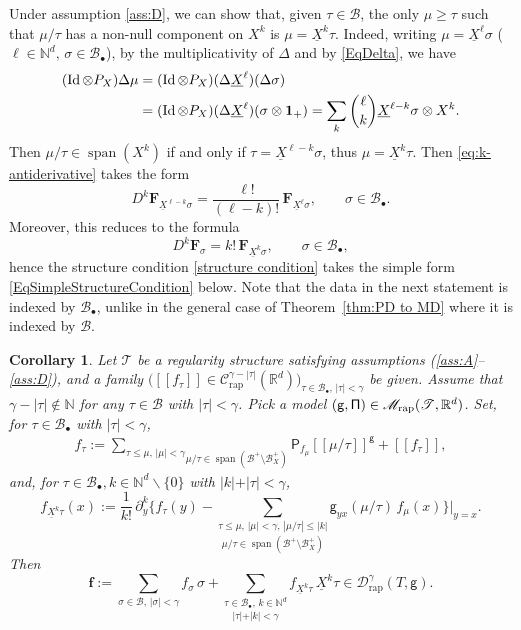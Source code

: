 \documentclass[11pt]{article}
\numberwithin{equation}{section}
\newcommand{\sbullet}{{\scriptscriptstyle\bullet}}
\DeclareMathOperator{\Span}{span}
\theoremstyle{plain}
\newtheorem{cor}[thm]{Corollary}
\theoremstyle{definition}
\DeclareMathOperator{\iden}{Id}
\newcommand{\Brac}[1]{[\![#1]\!]}
\newcommand{\bsf}{\boldsymbol{f}}
\newcommand{\rap}{\mathrm{rap}}
\newcommand{\sfP}{\mathsf{P}}
\newcommand{\sfg}{\mathsf{g}}
\newcommand{\bsF}{\boldsymbol{F}}
\newcommand{\scrM}{\mathscr{M}}
\newcommand{\scrT}{\mathscr{T}}
\newcommand{\bbN}{\mathbb{N}}
\newcommand{\bbR}{\mathbb{R}}
\newcommand{\mcB}{\mathcal{B}}
\newcommand{\mcC}{\mathcal{C}}
\newcommand{\mcD}{\mathcal{D}}
\begin{document}
Under assumption \eqref{ass:D}, we can show that, given $\tau\in\mcB$, the only $\mu\geq \tau$ such that $\mu/\tau$ has a non-null component on $X^k$ is $\mu=\underline{X}^k\tau$. Indeed, writing $\mu=\underline{X}^\ell\sigma$ ($\ell\in\bbN^d,\,\sigma\in\mcB_\sbullet$), by the multiplicativity of $\Delta$ and by \eqref{EqDelta}, we have
\begin{align*}
(\iden \otimes P_X)\Delta\mu
&=(\iden \otimes P_X)(\Delta\underline{X}^\ell)(\Delta\sigma)\\
&=(\iden \otimes P_X)(\Delta\underline{X}^\ell)(\sigma\otimes{\bf1}_+)
=\sum_{k}\binom{\ell}{k}\underline{X}^{\ell-k}\sigma\otimes X^{k}.
\end{align*}
Then $\mu/\tau\in\Span (X^k)$ if and only if $\tau=\underline{X}^{\ell-k}\sigma$, thus $\mu=\underline{X}^k\tau$.
Then \eqref{eq:k-antiderivative} takes the form
\[
D^k\bsF_{\underline{X}^{\ell-k}\sigma}=\frac{\ell!}{(\ell-k)!}\,\bsF_{\underline{X}^\ell\sigma},\qquad\sigma\in\mcB_\sbullet.
\]
Moreover, this reduces to the formula
\[
D^k\bsF_\sigma = k! \,\bsF_{\underline{X}^k\sigma},\qquad\sigma\in\mcB_\sbullet,
\]
hence the structure condition \eqref{structure condition} takes the simple form \eqref{EqSimpleStructureCondition} below. Note that the data in the next statement is indexed by $\mcB_\sbullet$, unlike in the general case of Theorem~\ref{thm:PD to MD} where it is indexed by $\mcB$.

\begin{cor} \label{thm:PD to MD2}
Let $\scrT$ be a regularity structure satisfying assumptions \textup{(\ref{ass:A}--\ref{ass:D})}, and a family $\bigl(\Brac{f_\tau}\in \mcC_\rap^{\gamma-|\tau|}(\bbR^d)\bigr)_{\tau\in\mcB_\sbullet,\,\vert\tau\vert<\gamma}$ be given. Assume that $\gamma-|\tau|\notin\bbN$ for any $\tau\in\mcB$ with $|\tau|<\gamma$. Pick a model ${\sf (g,\Pi)}\in\scrM_\rap(\scrT,\bbR^d)$. Set, for $\tau\in\mcB_\sbullet$ with $\vert\tau\vert<\gamma$,
\begin{align*}
f_\tau := \underset{\mu/\tau\in\Span (\mcB^+\setminus\mcB^+_X)}{\sum_{\tau\leq\mu, \,|\mu|<\gamma}} \sfP_{f_\mu}\Brac{\mu/\tau}^\sfg + \Brac{f_\tau},
\end{align*}
and, for $\tau\in\mcB_\sbullet, k\in\bbN^d\backslash\{0\}$ with $\vert k\vert+\vert\tau\vert<\gamma$,
\begin{equation} \label{EqSimpleStructureCondition}
f_{\underline{X}^k\tau}(x) :=
\frac1{k!}\,
\partial_y^k\bigg\{f_\tau(y) -
\underset{\mu/\tau\in\Span (\mcB^+\setminus\mcB^+_X)}{\sum_{\tau\leq\mu, \,|\mu|<\gamma,\, |\mu/\tau|\le|k|}}
\sfg_{yx}(\mu/\tau)\,f_\mu(x)\bigg\}\Big|_{y=x}.
\end{equation}
Then
\[
\bsf := \sum_{\sigma\in\mcB,\, \vert\sigma\vert<\gamma}f_\sigma\,\sigma + \underset{\vert\tau\vert+\vert k\vert<\gamma}{\sum_{\tau\in\mcB_\sbullet,\, k\in\bbN^d}} f_{\underline{X}^k\tau}\,\underline{X}^k\tau\in\mcD_\rap^{\gamma}(T, \sfg).
\]
\end{cor}
\end{document}
